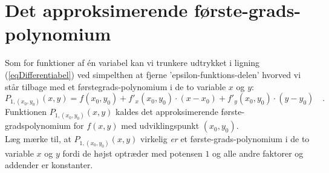 


\section{Det approksimerende første-grads-polynomium}

Som for funktioner af \'{e}n variabel kan vi trunkere udtrykket i ligning (\ref{eqDifferentiabel}) ved simpelthen at fjerne 'epsilon-funktions-delen' hvorved vi står tilbage med et førstegrads-polynomium i de to variable $x$ og $y$:
\begin{equation}
P_{1, (x_{0}, y_{0})}(x,y) = f(x_{0}, y_{0}) + f'_{x}(x_{0}, y_{0})\cdot (x-x_{0}) + f'_{y}(x_{0}, y_{0})\cdot (y-y_{0}) \quad .
\end{equation}
Funktionen $P_{1, (x_{0}, y_{0})}(x,y)$ kaldes det approksimerende første-gradspolynomium for $f(x,y)$ med udviklingspunkt $(x_{0}, y_{0})$.\\

Læg mærke til, at $P_{1, (x_{0}, y_{0})}(x,y)$ virkelig \emph{er} et første-grads-polynomium i de to variable $x$ og $y$ fordi de højst optræder med potensen $1$ og alle andre faktorer og addender er konstanter.

